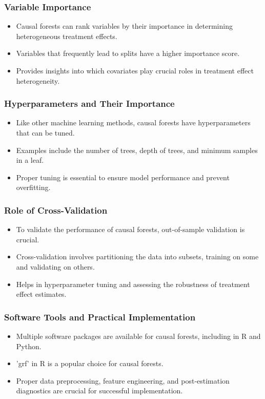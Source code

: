 \documentclass{beamer}
\begin{document}
\begin{frame}
\frametitle{Variable Importance}
\begin{itemize}
    \item Causal forests can rank variables by their importance in determining heterogeneous treatment effects.
    \item Variables that frequently lead to splits have a higher importance score.
    \item Provides insights into which covariates play crucial roles in treatment effect heterogeneity.
\end{itemize}
\end{frame}


\begin{frame}
\frametitle{Hyperparameters and Their Importance}
\begin{itemize}
    \item Like other machine learning methods, causal forests have hyperparameters that can be tuned.
    \item Examples include the number of trees, depth of trees, and minimum samples in a leaf.
    \item Proper tuning is essential to ensure model performance and prevent overfitting.
\end{itemize}
\end{frame}


\begin{frame}
\frametitle{Role of Cross-Validation}
\begin{itemize}
    \item To validate the performance of causal forests, out-of-sample validation is crucial.
    \item Cross-validation involves partitioning the data into subsets, training on some and validating on others.
    \item Helps in hyperparameter tuning and assessing the robustness of treatment effect estimates.
\end{itemize}
\end{frame}


\begin{frame}
\frametitle{Software Tools and Practical Implementation}
\begin{itemize}
    \item Multiple software packages are available for causal forests, including in R and Python.
    \item 'grf' in R is a popular choice for causal forests.
    \item Proper data preprocessing, feature engineering, and post-estimation diagnostics are crucial for successful implementation.
\end{itemize}
\end{frame}
\end{document}
